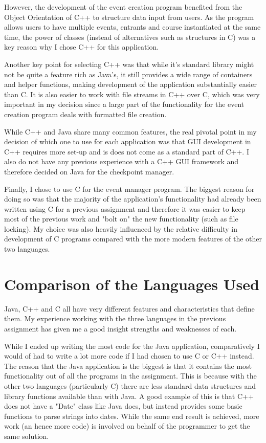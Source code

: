 \documentclass{article}
\begin{document}
However, the development of the event creation program benefited from the Object Orientation of C++ to structure data input from users. As the program allows users to have multiple events, entrants and course instantiated at the same time, the power of classes (instead of alternatives such as structures in C) was a key reason why I chose C++ for this application.

Another key point for selecting C++ was that while it's standard library might not be quite a feature rich as Java's, it still provides a wide range of containers and helper functions, making development of the application substantially easier than C. It is also easier to work with file streams in C++ over C, which was very important in my decision since a large part of the functionality for the event creation program deals with formatted file creation.

While C++ and Java share many common features, the real pivotal point in my decision of which one to use for each application was that GUI development in C++ requires more set-up and is does not come as a standard part of C++. I also do not have any previous experience with a C++ GUI framework and therefore decided on Java for the checkpoint manager.

Finally, I chose to use C for the event manager program. The biggest reason for doing so was that the majority of the application's functionality had already been written using C for a previous assignment and therefore it was easier to keep most of the previous work and "bolt on" the new functionality (such as file locking). My choice was also heavily influenced by the relative difficulty in development of C programs compared with the more modern features of the other two languages.

\section{Comparison of the Languages Used}
Java, C++ and C all have very different features and characteristics that define them. My experience working with the three languages in the previous assignment has given me a good insight strengths and weaknesses of each.

While I ended up writing the most code for the Java application, comparatively I would of had to write a lot more code if I had chosen to use C or C++ instead. The reason that the Java application is the biggest is that it contains the most functionality out of all the programs in the assignment. This is because with the other two languages (particularly C) there are less standard data structures and library functions available than with Java. A good example of this is that C++ does not have a "Date" class like Java does, but instead provides some basic functions to parse strings into dates. While the same end result is achieved, more work (an hence more code) is involved on behalf of the programmer to get the same solution.
\end{document}
